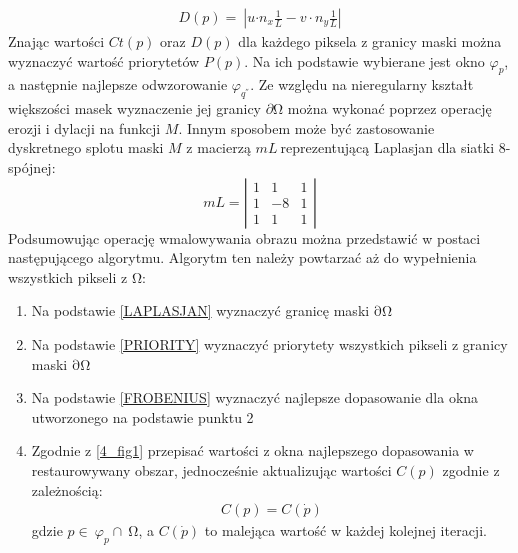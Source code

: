 \documentclass[12pt, twoside, openany]{report}
\theoremstyle{definition}
\begin{document}
\begin{align}
D(p)=\ \left|u{\cdot n}_x\frac{1}{L}-v\cdot n_y\frac{1}{L}\right|
\end{align}
Znając wartości $Ct\left(p\right)$ oraz $D(p)$ dla każdego piksela z granicy maski można wyznaczyć wartość priorytetów $P(p)$. Na ich podstawie wybierane jest okno ${\varphi }_p$, a następnie najlepsze odwzorowanie ${\varphi }_{q^{''}}$. Ze względu na nieregularny kształt większości masek wyznaczenie jej granicy $\partial \mathrm{\Omega }$ można wykonać poprzez operację erozji i dylacji na funkcji $M$. Innym sposobem może być zastosowanie dyskretnego splotu maski $M$ z macierzą $mL\ $reprezentującą Laplasjan dla siatki 8-spójnej: 
\begin{equation}
mL=\left| \begin{array}{ccc}
1 & 1 & 1 \\ 
1 & -8 & 1 \\ 
1 & 1 & 1 \end{array}
\right|	
\label{LAPLASJAN}
\end{equation}
Podsumowując operację wmalowywania obrazu można przedstawić w postaci następującego algorytmu. Algorytm ten należy powtarzać aż do wypełnienia wszystkich pikseli z $\mathrm{\Omega }$:
\begin{enumerate}
\item
Na podstawie \eqref{LAPLASJAN} wyznaczyć granicę maski $\mathrm{\partial }\mathrm{\Omega }$
\item
Na podstawie \eqref{PRIORITY} wyznaczyć priorytety wszystkich pikseli z granicy maski $\mathrm{\partial }\mathrm{\Omega }$
\item
Na podstawie \eqref{FROBENIUS} wyznaczyć najlepsze dopasowanie dla okna utworzonego na podstawie punktu 2 
\item
Zgodnie z \autoref{4_fig1} przepisać wartości z okna najlepszego dopasowania w restaurowywany obszar, jednocześnie aktualizując wartości $C(p)$ zgodnie z zależnością:
\begin{align}
C\left(p\right)=C\left(\dot{p}\right)
\end{align} 
gdzie $p\in \ {\varphi }_p\cap \ \mathrm{\Omega }$, a $C\left(\dot{p}\right)$ to malejąca wartość w każdej kolejnej iteracji.
\end{enumerate}
\end{document}
